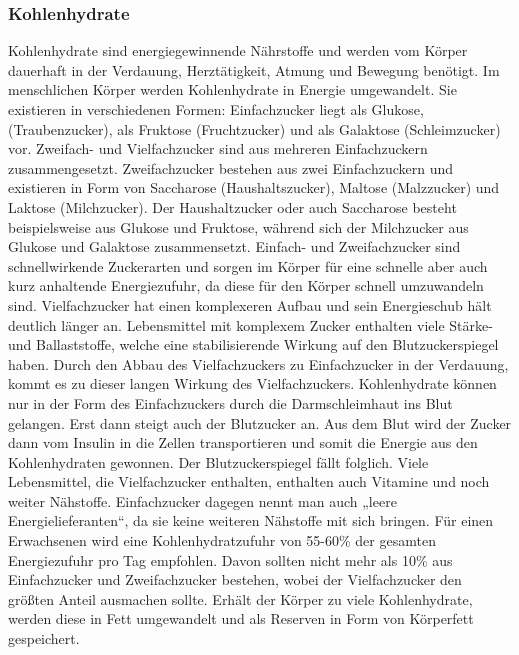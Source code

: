 	\subsubsection{Kohlenhydrate}
		Kohlenhydrate sind energiegewinnende Nährstoffe und werden vom Körper dauerhaft in der Verdauung, Herztätigkeit, Atmung und Bewegung benötigt. \cite{SG} Im menschlichen Körper werden Kohlenhydrate in Energie umgewandelt. Sie existieren in verschiedenen Formen: Einfachzucker liegt als Glukose, (Traubenzucker), als Fruktose (Fruchtzucker) und als Galaktose (Schleimzucker) vor. Zweifach- und Vielfachzucker sind aus mehreren Einfachzuckern zusammengesetzt. Zweifachzucker bestehen aus zwei Einfachzuckern und existieren in Form von Saccharose (Haushaltszucker), Maltose (Malzzucker) und Laktose (Milchzucker). \cite{ND} Der Haushaltzucker oder auch Saccharose besteht beispielsweise aus Glukose und Fruktose, während sich der Milchzucker aus Glukose und Galaktose zusammensetzt. \cite{SG} Einfach- und Zweifachzucker sind schnellwirkende Zuckerarten und sorgen im Körper für eine schnelle aber auch kurz anhaltende Energiezufuhr, da diese für den Körper schnell umzuwandeln sind. Vielfachzucker hat einen komplexeren Aufbau und sein Energieschub hält deutlich länger an. Lebensmittel mit komplexem Zucker enthalten viele Stärke- und Ballaststoffe, welche eine stabilisierende Wirkung auf den Blutzuckerspiegel haben. Durch den Abbau des Vielfachzuckers zu Einfachzucker in der Verdauung, kommt es zu dieser langen Wirkung des Vielfachzuckers. \cite{ND} Kohlenhydrate können nur in der Form des Einfachzuckers durch die Darmschleimhaut ins Blut gelangen. Erst dann steigt auch der Blutzucker an. Aus dem Blut wird der Zucker dann vom Insulin in die Zellen transportieren und somit die Energie aus den Kohlenhydraten gewonnen. Der Blutzuckerspiegel fällt folglich. \cite{SG} \newline
		Viele Lebensmittel, die Vielfachzucker enthalten, enthalten auch Vitamine und noch weiter Nähstoffe. Einfachzucker dagegen nennt man auch „leere Energielieferanten“, da sie keine weiteren Nähstoffe mit sich bringen. Für einen Erwachsenen wird eine Kohlenhydratzufuhr von 55-60\% der gesamten Energiezufuhr pro Tag empfohlen. Davon sollten nicht mehr als 10\% aus Einfachzucker und Zweifachzucker bestehen, wobei der Vielfachzucker den größten Anteil ausmachen sollte. \newline
		Erhält der Körper zu viele Kohlenhydrate, werden diese in Fett umgewandelt und als Reserven in Form von Körperfett gespeichert. \cite{ND} \newline
